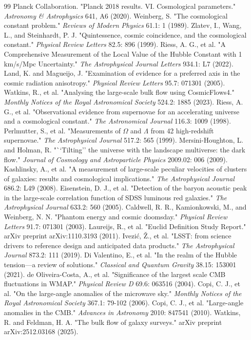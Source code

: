 \documentclass{article}
\begin{document}
\begin{thebibliography}{99}
 Planck Collaboration. "Planck 2018 results. VI. Cosmological parameters." \textit{Astronomy \& Astrophysics} 641, A6 (2020).
 Weinberg, S. "The cosmological constant problem." \textit{Reviews of Modern Physics} 61.1: 1 (1989).
 Zlatev, I., Wang, L., and Steinhardt, P. J. "Quintessence, cosmic coincidence, and the cosmological constant." \textit{Physical Review Letters} 82.5: 896 (1999).
 Riess, A. G., et al. "A Comprehensive Measurement of the Local Value of the Hubble Constant with 1 km/s/Mpc Uncertainty." \textit{The Astrophysical Journal Letters} 934.1: L7 (2022).
 Land, K. and Magueijo, J. "Examination of evidence for a preferred axis in the cosmic radiation anisotropy." \textit{Physical Review Letters} 95.7: 071301 (2005).
 Watkins, R., et al. "Analysing the large-scale bulk flow using CosmicFlows4." \textit{Monthly Notices of the Royal Astronomical Society} 524.2: 1885 (2023).
 Riess, A. G., et al. "Observational evidence from supernovae for an accelerating universe and a cosmological constant." \textit{The Astronomical Journal} 116.3: 1009 (1998).
 Perlmutter, S., et al. "Measurements of $\Omega$ and $\Lambda$ from 42 high-redshift supernovae." \textit{The Astrophysical Journal} 517.2: 565 (1999).
 Mersini-Houghton, L. and Holman, R. "``Tilting'' the universe with the landscape multiverse: the dark flow." \textit{Journal of Cosmology and Astroparticle Physics} 2009.02: 006 (2009).
 Kashlinsky, A., et al. "A measurement of large-scale peculiar velocities of clusters of galaxies: results and cosmological implications." \textit{The Astrophysical Journal} 686.2: L49 (2008).
 Eisenstein, D. J., et al. "Detection of the baryon acoustic peak in the large-scale correlation function of SDSS luminous red galaxies." \textit{The Astrophysical Journal} 633.2: 560 (2005).
 Caldwell, R. R., Kamionkowski, M., and Weinberg, N. N. "Phantom energy and cosmic doomsday." \textit{Physical Review Letters} 91.7: 071301 (2003).
 Laureijs, R., et al. "Euclid Definition Study Report." arXiv preprint arXiv:1110.3193 (2011).
 Ivezić, Ž., et al. "LSST: from science drivers to reference design and anticipated data products." \textit{The Astrophysical Journal} 873.2: 111 (2019).
 Di Valentino, E., et al. "In the realm of the Hubble tension—a review of solutions." \textit{Classical and Quantum Gravity} 38.15: 153001 (2021).
 de Oliveira-Costa, A., et al. "Significance of the largest scale CMB fluctuations in WMAP." \textit{Physical Review D} 69.6: 063516 (2004).
 Copi, C. J., et al. "On the large-angle anomalies of the microwave sky." \textit{Monthly Notices of the Royal Astronomical Society} 367.1: 79-102 (2006).
 Copi, C. J., et al. "Large-angle anomalies in the CMB." \textit{Advances in Astronomy} 2010: 847541 (2010).
 Watkins, R. and Feldman, H. A. "The bulk flow of galaxy surveys." arXiv preprint arXiv:2512.03168 (2025).
\end{thebibliography}
\end{document}

